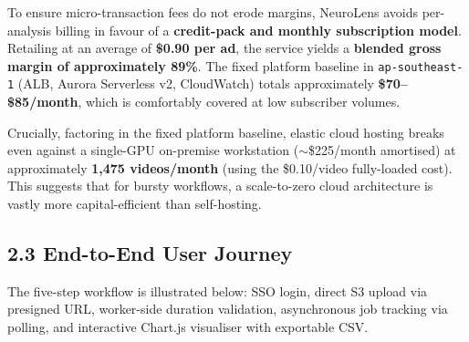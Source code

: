 \documentclass[10pt,a4paper]{article}
\begin{document}
To ensure micro-transaction fees do not erode margins, NeuroLens avoids per-analysis billing in favour of a \textbf{credit-pack and monthly subscription model}. Retailing at an average of \textbf{\$0.90 per ad}, the service yields a \textbf{blended gross margin of approximately 89\%}. The fixed platform baseline in \texttt{ap-southeast-1} (ALB, Aurora Serverless v2, CloudWatch) totals approximately \textbf{\$70--\$85/month}, which is comfortably covered at low subscriber volumes.

Crucially, factoring in the fixed platform baseline, elastic cloud hosting breaks even against a single-GPU on-premise workstation ($\sim$\$225/month amortised) at approximately \textbf{1,475 videos/month} (using the \$0.10/video fully-loaded cost). This suggests that for bursty workflows, a scale-to-zero cloud architecture is vastly more capital-efficient than self-hosting.

\subsection*{\textsf{2.3 End-to-End User Journey}}
The five-step workflow is illustrated below: SSO login, direct S3 upload via presigned URL, worker-side duration validation, asynchronous job tracking via polling, and interactive Chart.js visualiser with exportable CSV.
\end{document}
